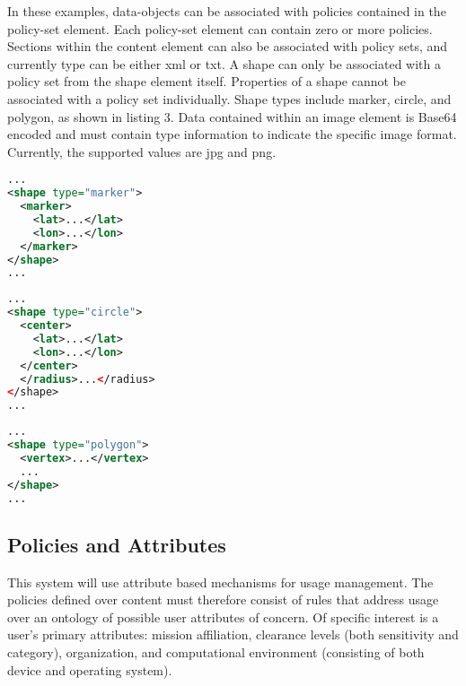 In these examples, data-objects can be associated with policies contained in the policy-set element.  Each policy-set element can contain zero or more policies.  Sections within the content element can also be associated with policy sets, and currently type can be either xml or txt.  A shape can only be associated with a policy set from the shape element itself.  Properties of a shape cannot be associated with a policy set individually.  Shape types include marker, circle, and polygon, as shown in listing 3. Data contained within an image element is Base64 encoded and must contain type information to indicate the specific image format.  Currently, the supported values are jpg and png.

\par\noindent
\begin{minipage}[t]{.30\textwidth}
\begin{lstlisting}[language=xml, label=lst:marker-shape, caption=Marker]
...
<shape type="marker">
  <marker>
    <lat>...</lat>
    <lon>...</lon>
  </marker>
</shape>
...
\end{lstlisting}
\end{minipage}
\hfill
\begin{minipage}[t]{.30\textwidth}
\begin{lstlisting}[language=xml, label=lst:circle-shape, caption=Circle]
...
<shape type="circle">
  <center>
    <lat>...</lat>
    <lon>...</lon>
  </center>
  </radius>...</radius>
</shape>
...
\end{lstlisting}
\end{minipage}
\hfill
\begin{minipage}[t]{.30\textwidth}
\begin{lstlisting}[language=xml, label=lst:polygon-shape, caption=Polygon]
...
<shape type="polygon">
  <vertex>...</vertex>
  ...
</shape>
...
\end{lstlisting}
\end{minipage}

\subsection{Policies and Attributes}
This system will use attribute based mechanisms for usage management.  The policies defined over content must therefore consist of rules that address usage over an ontology of possible user attributes of concern.  Of specific interest is a user's primary attributes: mission affiliation, clearance levels (both sensitivity and category), organization, and computational environment (consisting of both device and operating system).

